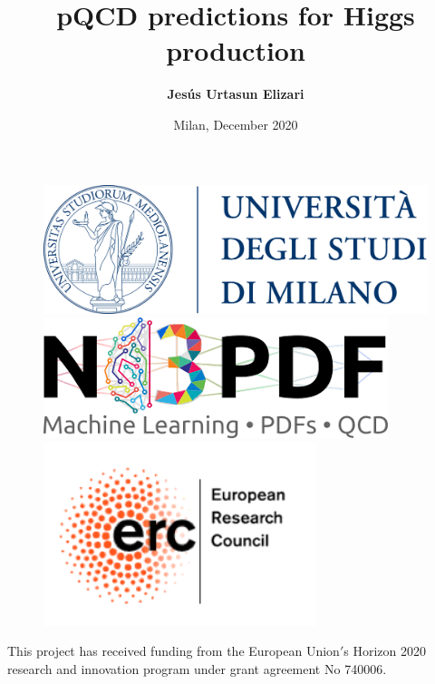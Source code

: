 \documentclass[aspectratio=43]{beamer}
\title[Perturbative QCD predictions for Higgs production]{pQCD predictions for Higgs production}
\author{\textbf {Jes\'us Urtasun Elizari}}
\date{Milan, December 2020}
\begin{document}
\begin{frame}

	\vspace{1.0 cm}
	
	
	\vspace{0.25 cm}

	\begin{figure}
		\includegraphics[width = 3.0 cm]{plots/unimi.png}
		\hfill
		\includegraphics[width = 3.0 cm]{plots/n3pdf.png}
		\hfill
		\includegraphics[width = 3.0 cm]{plots/erc.png}
		\endminipage
	\end{figure}

	\vspace{1.0 cm}
	
	{\scriptsize \color{blue} This project has received funding from the European Union$'$s Horizon 2020 research and innovation program under grant agreement No 740006.}

\end{frame}
\end{document}
